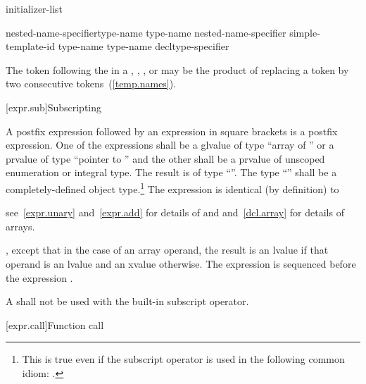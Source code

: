 \begin{bnf}
\br
    initializer-list
\end{bnf}


\begin{bnf}
\br
    nested-name-specifier\opt type-name \terminal{::\,\tilde} type-name\br
    nested-name-specifier  simple-template-id \terminal{::\,\tilde} type-name\br
    \terminal{\tilde} type-name\br
    \terminal{\tilde} decltype-specifier
\end{bnf}

\pnum
\begin{note} The \tcode{>} token following the
 in a ,
, , or
 may be the product of replacing a
\tcode{>{>}} token by two consecutive \tcode{>}
tokens~(\ref{temp.names}).\end{note}

[expr.sub]{Subscripting}

\pnum
{}%
%
A postfix expression followed by an expression in square brackets is a
postfix expression. One of the expressions shall be a glvalue of type ``array of
'' or a prvalue of type ``pointer
to '' and the other shall be a prvalue of unscoped enumeration or integral type.
The result is of type ``''.
%
The type ``'' shall be a completely-defined object type.\footnote{This
is true even if the subscript operator is used in the following common idiom:
.}
The expression  is identical (by definition) to
\begin{note}
see~\ref{expr.unary} and~\ref{expr.add} for details of \tcode{*} and
\tcode{+} and~\ref{dcl.array} for details of arrays.
\end{note}, except that in the case of an array operand, the result is an lvalue
if that operand is an lvalue and an xvalue otherwise.
The expression  is sequenced before the expression .

\pnum
A  shall not be used with the built-in subscript operator.

[expr.call]{Function call}

